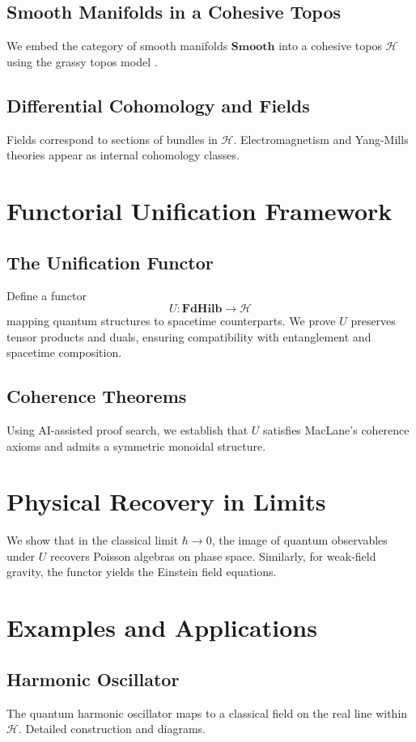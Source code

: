 \documentclass[11pt]{article}
\begin{document}
\subsection{Smooth Manifolds in a Cohesive Topos}
We embed the category of smooth manifolds \(\mathbf{Smooth}\) into a cohesive topos \(\mathcal{H}\) using the grassy topos model \cite{uribe2013synthetic}.

\subsection{Differential Cohomology and Fields}
Fields correspond to sections of bundles in \(\mathcal{H}\). Electromagnetism and Yang-Mills theories appear as internal cohomology classes.

\section{Functorial Unification Framework}
\subsection{The Unification Functor}
Define a functor
\[
    U: \mathbf{FdHilb} \longrightarrow \mathcal{H}
\]
mapping quantum structures to spacetime counterparts. We prove \(U\) preserves tensor products and duals, ensuring compatibility with entanglement and spacetime composition.

\subsection{Coherence Theorems}
Using AI-assisted proof search, we establish that \(U\) satisfies MacLane's coherence axioms and admits a symmetric monoidal structure.

\section{Physical Recovery in Limits}
We show that in the classical limit \(\hbar \to 0\), the image of quantum observables under \(U\) recovers Poisson algebras on phase space. Similarly, for weak-field gravity, the functor yields the Einstein field equations.

\section{Examples and Applications}
\subsection{Harmonic Oscillator}
The quantum harmonic oscillator maps to a classical field on the real line within \(\mathcal{H}\). Detailed construction and diagrams.
\end{document}
